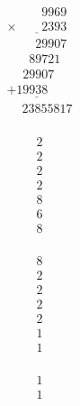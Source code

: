 \begin{minipage}[t]{0.05\linewidth}
\begin{align*}\begin{array}{c}
\textvisiblespace
\\
\textvisiblespace
\end{array}\end{align*}
\end{minipage}
\begin{minipage}[t]{0.3\linewidth}
\begin{align*}\begin{array}{c}
\phantom{
\times0000
}
9969\\
\underline{
\times
\phantom{
0000
}
2393
}\\
\phantom{
+000
}
29907
\\
\phantom{
+00
}
89721
\phantom0\\
\phantom{
+0
}
29907
\phantom0\phantom0\\
\underline{
+
19938
\phantom0\phantom0\phantom0
}
\\
\phantom{+}
23855817
\end{array}\end{align*}
\end{minipage}
\begin{minipage}[t]{0.05\linewidth}
\begin{align*}\begin{array}{c}
2
\\
2
\\
2
\\
2
\\
8
\\
6
\\
8
\end{array}\end{align*}
\end{minipage}
\begin{minipage}[t]{0.05\linewidth}
\begin{align*}\begin{array}{c}
8
\\
2
\\
2
\\
2
\\
2
\\
1
\\
1
\end{array}\end{align*}
\end{minipage}
\begin{minipage}[t]{0.05\linewidth}
\begin{align*}\begin{array}{c}
1
\\
1
\end{array}\end{align*}
\end{minipage}

